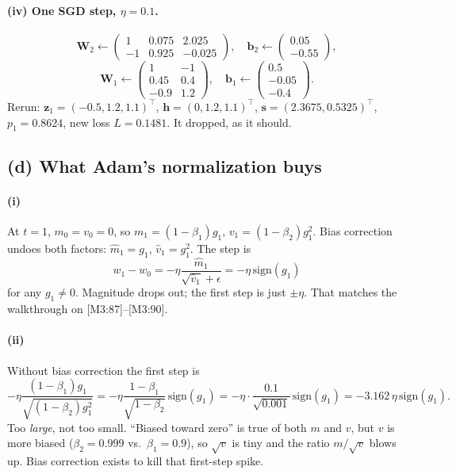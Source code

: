 \documentclass[11pt]{article}
\newcommand{\vct}[1]{\mathbf{#1}}
\newcommand{\mat}[1]{\mathbf{#1}}
\begin{document}
\paragraph{(iv) One SGD step, \(\eta=0.1\).}
\[
\mat{W}_2\leftarrow
\begin{pmatrix}1 & 0.075 & 2.025\\ -1 & 0.925 & -0.025\end{pmatrix},
\quad
\vct{b}_2\leftarrow
\begin{pmatrix}0.05\\ -0.55\end{pmatrix},
\]
\[
\mat{W}_1\leftarrow
\begin{pmatrix}1 & -1\\ 0.45 & 0.4\\ -0.9 & 1.2\end{pmatrix},
\quad
\vct{b}_1\leftarrow
\begin{pmatrix}0.5\\ -0.05\\ -0.4\end{pmatrix}.
\]
Rerun:
\(\vct{z}_1=(-0.5,1.2,1.1)^\top\),
\(\vct{h}=(0,1.2,1.1)^\top\),
\(\vct{s}=(2.3675,0.5325)^\top\),
\(p_1=0.8624\),
new loss \(L=0.1481\). It dropped, as it should.

\subsection*{(d) What Adam's normalization buys}

\paragraph{(i)}
At \(t=1\), \(m_0=v_0=0\), so
\(m_1=(1-\beta_1)g_1\), \(v_1=(1-\beta_2)g_1^2\).
Bias correction undoes both factors:
\(\hat m_1=g_1\), \(\hat v_1=g_1^2\).
The step is
\[
w_1-w_0
=-\eta\frac{\hat m_1}{\sqrt{\hat v_1}+\epsilon}
=-\eta\,\mathrm{sign}(g_1)
\]
for any \(g_1\neq 0\). Magnitude drops out; the first step is just
\(\pm\eta\). That matches the walkthrough on [M3:87]--[M3:90].

\paragraph{(ii)}
Without bias correction the first step is
\[
-\eta\frac{(1-\beta_1)g_1}{\sqrt{(1-\beta_2)g_1^2}}
=-\eta\frac{1-\beta_1}{\sqrt{1-\beta_2}}\,\mathrm{sign}(g_1)
=-\eta\cdot\frac{0.1}{\sqrt{0.001}}\,\mathrm{sign}(g_1)
=-3.162\,\eta\,\mathrm{sign}(g_1).
\]
Too \emph{large}, not too small. ``Biased toward zero'' is true of
both \(m\) and \(v\), but \(v\) is more biased (\(\beta_2=0.999\) vs.\
\(\beta_1=0.9\)), so \(\sqrt{v}\) is tiny and the ratio \(m/\sqrt{v}\)
blows up. Bias correction exists to kill that first-step spike.
\end{document}
